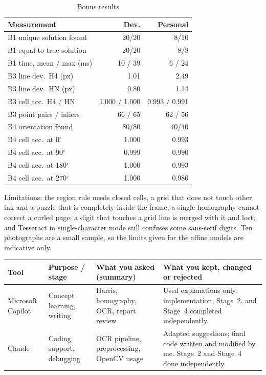 \documentclass[conference]{IEEEtran}
\begin{document}
\makeatletter\setlength{\@fptop}{0pt}\makeatother %
\begin{table}[!t]
\caption{Bonus results}
\label{tab:bonus}
\centering
\begin{tabular}{lrr}
\toprule
Measurement & Dev. & Personal\\
\midrule
B1 unique solution found & 20/20 & 8/10\\
B1 equal to true solution & 20/20 & 8/8\\
B1 time, mean / max (ms) & 10 / 39 & 6 / 24\\
B3 line dev.\ H4 (px) & 1.01 & 2.49\\
B3 line dev.\ HN (px) & 0.80 & 1.14\\
B3 cell acc.\ H4 / HN & 1.000 / 1.000 & 0.993 / 0.991\\
B3 point pairs / inliers & 66 / 65 & 62 / 56\\
B4 orientation found & 80/80 & 40/40\\
B4 cell acc.\ at 0$^\circ$ & 1.000 & 0.993\\
B4 cell acc.\ at 90$^\circ$ & 0.999 & 0.990\\
B4 cell acc.\ at 180$^\circ$ & 1.000 & 0.993\\
B4 cell acc.\ at 270$^\circ$ & 1.000 & 0.986\\
\bottomrule
\end{tabular}
\end{table}

Limitations: the region rule needs closed cells, a grid that does not touch
other ink and a puzzle that is completely inside the frame; a single
homography cannot correct a curled page; a digit that touches a grid line is
merged with it and lost; and Tesseract in single-character mode still
confuses some sans-serif digits. Ten photographs are a small sample, so the
limits given for the affine models are indicative only.

\clearpage
\onecolumn
{}

\begin{center}
\renewcommand{\arraystretch}{2.6}
\begin{tabular}{|p{}|p{}|p{}|p{}|}
\hline
Tool & Purpose / stage & What you asked (summary) & What you kept, changed or rejected\\
\hline
Microsoft Copilot & Concept learning, writing & Harris, homography, OCR, report review & Used explanations only; implementation, Stage~2, and Stage~4 completed independently.\\
\hline
Claude & Coding support, debugging & OCR pipeline, preprocessing, OpenCV usage & Adapted suggestions; final code written and modified by me. Stage~2 and Stage~4 done independently.\\
\hline
\end{tabular}
\end{center}
\end{document}
